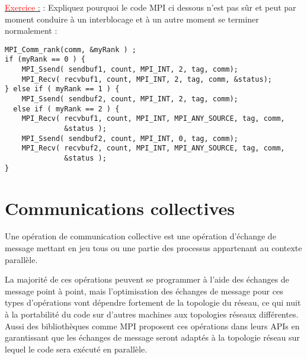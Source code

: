 \documentclass[fleqn,11pt]{article}
\begin{document}
\underline{\textcolor{red}{Exercice} :} : Expliquez pourquoi le code MPI ci dessous n'est pas sûr et peut par moment
conduire à un interblocage et à un autre moment se terminer normalement :

\begin{lstlisting}
MPI_Comm_rank(comm, &myRank ) ;
if (myRank == 0 ) {
    MPI_Ssend( sendbuf1, count, MPI_INT, 2, tag, comm);
    MPI_Recv( recvbuf1, count, MPI_INT, 2, tag, comm, &status);
} else if ( myRank == 1 ) {
    MPI_Ssend( sendbuf2, count, MPI_INT, 2, tag, comm);
  else if ( myRank == 2 ) {
    MPI_Recv( recvbuf1, count, MPI_INT, MPI_ANY_SOURCE, tag, comm, 
              &status );
    MPI_Ssend( sendbuf2, count, MPI_INT, 0, tag, comm);
    MPI_Recv( recvbuf2, count, MPI_INT, MPI_ANY_SOURCE, tag, comm, 
              &status );
}
\end{lstlisting}

\section{Communications collectives}

Une opération de communication collective est une opération d'échange de message
mettant en jeu tous ou une partie des processus appartenant au contexte
parallèle.

La majorité de ces opérations peuvent se programmer à l'aide des échanges de
message point à point, mais l'optimisation des échanges de message pour ces
types d'opérations vont dépendre fortement de la topologie du réseau, ce qui nuit
à la portabilité du code sur d'autres machines aux topologies réseaux différentes. 
Aussi des bibliothèques comme MPI proposent ces opérations dans leurs APIs en garantissant
que les échanges de message seront adaptés à la topologie réseau sur lequel le code sera
exécuté en parallèle.
\end{document}
